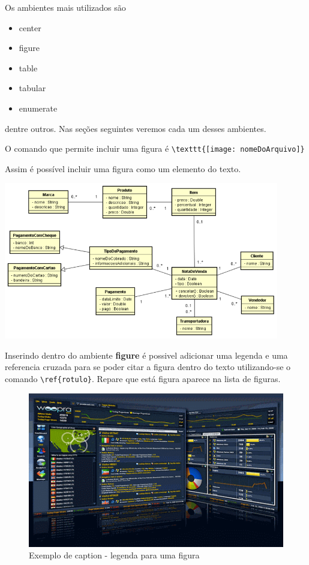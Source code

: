 Os ambientes mais utilizados são

\begin{itemize}
\item center
\item figure
\item table
\item tabular
\item enumerate 
\end{itemize}
%
dentre outros. Nas seções seguintes veremos cada um desses ambientes.





O comando que permite incluir uma figura é \verb|\texttt{[image: nomeDoArquivo]}|

Assim é possível incluir uma figura como um elemento do texto.

\includegraphics[width=0.9\textwidth]{modelo1}

Inserindo dentro do ambiente \textbf{figure} é possivel adicionar uma legenda e
uma referencia cruzada para se poder citar a figura dentro do texto
utilizando-se o comando \verb|\ref{rotulo}|. Repare que
está figura aparece na lista de figuras.

\begin{figure}[!hb]
\centering
\includegraphics[scale=0.4]{interface1} 
\caption{Exemplo de caption - legenda para uma figura}
\label{fig:interface}
\end{figure}

